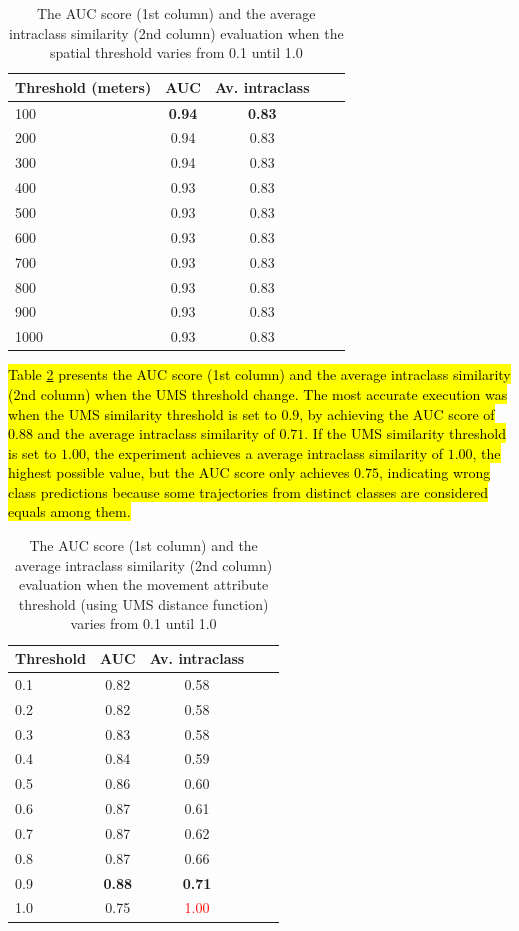\documentclass[12pt]{article}
\begin{document}
\begin{table}[ht!]
  \scriptsize
  \centering
  \begin{tabular}{|l|c|c|c|c|}
  	\hline
Threshold (meters) & AUC & Av. intraclass\\
  	\hline
100 & \textbf{0.94} & \textbf{0.83}\\
200 & 0.94 & 0.83\\
300 & 0.94 & 0.83\\
400 & 0.93 & 0.83\\
500 & 0.93 & 0.83\\
600 & 0.93 & 0.83\\
700 & 0.93 & 0.83\\
800 & 0.93 & 0.83\\
900 & 0.93 & 0.83\\
1000 & 0.93 & 0.83\\
    \hline
  \end{tabular}
  \caption{The AUC score (1st column) and the average intraclass similarity (2nd column) evaluation when the spatial threshold varies from 0.1 until 1.0}
  \label{tab:sensibility_spatial_thresholds}
\end{table}

\hl{Table {\ref{tab:sensibility_movement_thresholds}} presents the AUC score (1st column) and the average intraclass similarity (2nd column) when the UMS threshold change. The most accurate execution was when the UMS similarity threshold is set to $0.9$, by achieving the AUC score of $0.88$ and the average intraclass similarity of $0.71$. If the UMS similarity threshold is set to $1.00$, the experiment achieves a average intraclass similarity of $1.00$, the highest possible value, but the AUC score only achieves $0.75$, indicating wrong class predictions because some trajectories from distinct classes are considered equals among them.}


\begin{table}[ht!]
  \scriptsize
  \centering
  \begin{tabular}{|l|c|c|c|c|}
  	\hline
Threshold & AUC & Av. intraclass\\
  	\hline
0.1 & 0.82 & 0.58\\
0.2 & 0.82 & 0.58\\
0.3 & 0.83 & 0.58\\
0.4 & 0.84 & 0.59\\
0.5 & 0.86 & 0.60\\
0.6 & 0.87 & 0.61\\
0.7 & 0.87 & 0.62\\
0.8 & 0.87 & 0.66\\
0.9 & \textbf{0.88} & \textbf{0.71}\\
1.0 & 0.75 & \textcolor{red}{1.00}\\
    \hline
  \end{tabular}
  \caption{The AUC score (1st column) and the average intraclass similarity (2nd column) evaluation when the movement attribute threshold (using UMS distance function) varies from 0.1 until 1.0}
  \label{tab:sensibility_movement_thresholds}
\end{table}
\end{document}
